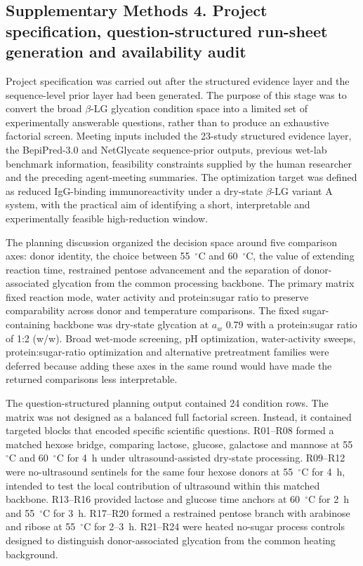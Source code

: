 \subsection*{Supplementary Methods 4. Project specification, question-structured run-sheet generation and availability audit}

Project specification was carried out after the structured evidence layer and the
sequence-level prior layer had been generated. The purpose of this stage was to
convert the broad $\beta$-LG glycation condition space into a limited set of
experimentally answerable questions, rather than to produce an exhaustive factorial
screen. Meeting inputs included the 23-study structured evidence layer, the
BepiPred-3.0 and NetGlycate sequence-prior outputs, previous wet-lab benchmark
information, feasibility constraints supplied by the human researcher and the
preceding agent-meeting summaries. The optimization target was defined as reduced
IgG-binding immunoreactivity under a dry-state $\beta$-LG variant A system, with
the practical aim of identifying a short, interpretable and experimentally
feasible high-reduction window.

The planning discussion organized the decision space around five comparison axes:
donor identity, the choice between 55~$^\circ$C and 60~$^\circ$C, the value of
extending reaction time, restrained pentose advancement and the separation of
donor-associated glycation from the common processing backbone. The primary
matrix fixed reaction mode, water activity and protein:sugar ratio to preserve
comparability across donor and temperature comparisons. The fixed sugar-containing
backbone was dry-state glycation at $a_w$ 0.79 with a protein:sugar ratio of
1:2 (w/w). Broad wet-mode screening, pH optimization, water-activity sweeps,
protein:sugar-ratio optimization and alternative pretreatment families were
deferred because adding these axes in the same round would have made the returned
comparisons less interpretable.

The question-structured planning output contained 24 condition rows. The matrix
was not designed as a balanced full factorial screen. Instead, it contained
targeted blocks that encoded specific scientific questions. R01--R08 formed a
matched hexose bridge, comparing lactose, glucose, galactose and mannose at
55~$^\circ$C and 60~$^\circ$C for 4~h under ultrasound-assisted dry-state
processing. R09--R12 were no-ultrasound sentinels for the same four hexose donors
at 55~$^\circ$C for 4~h, intended to test the local contribution of ultrasound
within this matched backbone. R13--R16 provided lactose and glucose time anchors
at 60~$^\circ$C for 2~h and 55~$^\circ$C for 3~h. R17--R20 formed a restrained
pentose branch with arabinose and ribose at 55~$^\circ$C for 2--3~h. R21--R24
were heated no-sugar process controls designed to distinguish donor-associated
glycation from the common heating background.

